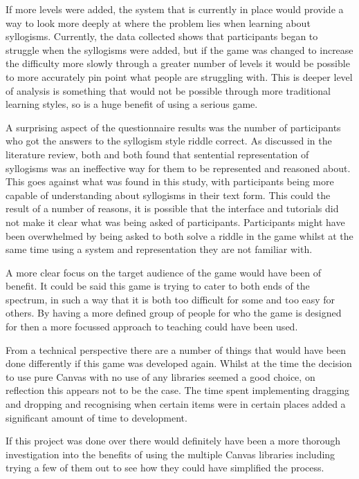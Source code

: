 \documentclass[12pt,a4paper]{report}
\begin{document}
If more levels were added, the system that is currently in place would provide a way to look more deeply at where the problem lies when learning about syllogisms. Currently, the data collected shows that participants began to struggle when the syllogisms were added, but if the game was changed to increase the difficulty more slowly through a greater number of levels it would be possible to more accurately pin point what people are struggling with. This is deeper level of analysis is something that would not be possible through more traditional learning styles, so is a huge benefit of using a serious game.

A surprising aspect of the questionnaire results was the number of participants who got the answers to the syllogism style riddle correct. As discussed in the literature review, both \cite{larkin1987diagram} and \cite{johnson1980mental} both found that sentential representation of syllogisms was an ineffective way for them to be represented and reasoned about. This goes against what was found in this study, with participants being more capable of understanding about syllogisms in their text form. This could the result of a number of reasons, it is possible that the interface and tutorials did not make it clear what was being asked of participants. Participants might have been overwhelmed by being asked to both solve a riddle in the game whilst at the same time using a system and representation they are not familiar with. 

A more clear focus on the target audience of the game would have been of benefit. It could be said this game is trying to cater to both ends of the spectrum, in such a way that it is both too difficult for some and too easy for others. By having a more defined group of people for who the game is designed for then a more focussed approach to teaching could have been used.

From a technical perspective there are a number of things that would have been done differently if this game was developed again. Whilst at the time the decision to use pure Canvas with no use of any libraries seemed a good choice, on reflection this appears not to be the case. The time spent implementing dragging and dropping and recognising when certain items were in certain places added a significant amount of time to development.

If this project was done over there would definitely have been a more thorough investigation into the benefits of using the multiple Canvas libraries including trying a few of them out to see how they could have simplified the process. 
\end{document}
